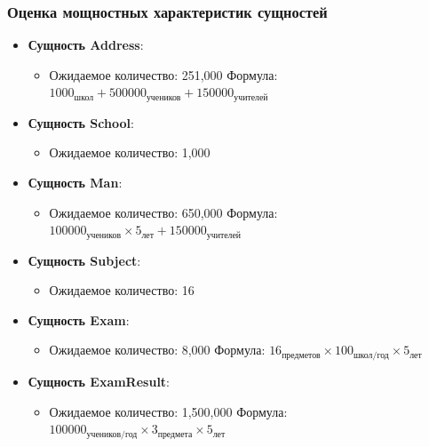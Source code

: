 \documentclass[a4paper]{article}
\begin{document}
\subsubsection{Оценка мощностных характеристик сущностей}
\begin{itemize}
      \item \textbf{Сущность Address}:
            \begin{itemize}
                  \item Ожидаемое количество: 251,000 \newline
                        Формула: $1000_{\text{школ}} + 500000_{\text{учеников}} + 150000_{\text{учителей}}$
            \end{itemize}

      \item \textbf{Сущность School}:
            \begin{itemize}
                  \item Ожидаемое количество: 1,000
            \end{itemize}

      \item \textbf{Сущность Man}:
            \begin{itemize}
                  \item Ожидаемое количество: 650,000 \newline
                        Формула: $100000_{\text{учеников}} \times 5_{\text{лет}} + 150000_{\text{учителей}}$
            \end{itemize}

      \item \textbf{Сущность Subject}:
            \begin{itemize}
                  \item Ожидаемое количество: 16
            \end{itemize}

      \item \textbf{Сущность Exam}:
            \begin{itemize}
                  \item Ожидаемое количество: 8,000 \newline
                        Формула: $16_{\text{предметов}} \times 100_{\text{школ/год}} \times 5_{\text{лет}}$
            \end{itemize}

      \item \textbf{Сущность ExamResult}:
            \begin{itemize}
                  \item Ожидаемое количество: 1,500,000 \newline
                        Формула: $100000_{\text{учеников/год}} \times 3_{\text{предмета}} \times 5_{\text{лет}}$
            \end{itemize}


\end{itemize}
\end{document}
